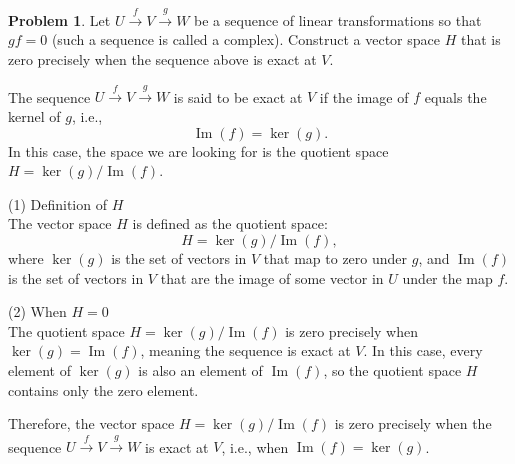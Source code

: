 \documentclass[12pt]{article}
\theoremstyle{definition}
\newtheorem{problem}{Problem}
\begin{document}
\begin{problem}
    Let $U \xrightarrow{f} V \xrightarrow{g} W$ be a sequence of linear transformations so that $gf = 0$ (such a sequence is called a complex).
    Construct a vector space $H$ that is zero precisely when the sequence above is exact at $V$.

    \begin{solution}
        The sequence \(U \xrightarrow{f} V \xrightarrow{g} W\) is said to be exact at \(V\) if the image of \(f\) equals the kernel of \(g\), i.e.,
        \[
        \operatorname{Im}(f) = \ker(g).
        \]
        In this case, the space we are looking for is the quotient space \(H = \ker(g) / \operatorname{Im}(f)\).
    
        (1) Definition of \(H\)\\
        The vector space \(H\) is defined as the quotient space:
        \[
        H = \ker(g) / \operatorname{Im}(f),
        \]
        where \(\ker(g)\) is the set of vectors in \(V\) that map to zero under \(g\), and \(\operatorname{Im}(f)\) is the set of vectors in \(V\) that are the image of some vector in \(U\) under the map \(f\).
    
        (2) When \(H = 0\)\\
        The quotient space \(H = \ker(g) / \operatorname{Im}(f)\) is zero precisely when \(\ker(g) = \operatorname{Im}(f)\), meaning the sequence is exact at \(V\). In this case, every element of \(\ker(g)\) is also an element of \(\operatorname{Im}(f)\), so the quotient space \(H\) contains only the zero element.
    
        Therefore, the vector space \(H = \ker(g) / \operatorname{Im}(f)\) is zero precisely when the sequence \(U \xrightarrow{f} V \xrightarrow{g} W\) is exact at \(V\), i.e., when \(\operatorname{Im}(f) = \ker(g)\).

    \end{solution}
\end{problem}
\end{document}
